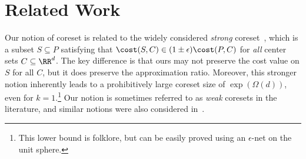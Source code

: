 \section{Related Work}
\label{sec:related}



Our notion of coreset is related to the widely considered \emph{strong} coreset~\cite{AgarwalHV04,Har-PeledM04},
which is a subset $S \subseteq P$ satisfying that $\cost(S, C) \in (1 \pm \epsilon) \cost(P, C)$ for \emph{all} center sets $C \subseteq \RR^d$.
The key difference is that ours may not preserve the cost value on $S$ for all $C$,
but it does preserve the approximation ratio.
Moreover, this stronger notion inherently leads to a prohibitively large coreset size of $\exp(\Omega(d))$, even for $k = 1$.\footnote{This lower bound is folklore, but can be easily proved using an $\epsilon$-net on the unit sphere.
}
Our notion is sometimes referred to as \emph{weak} coresets in the literature, and similar notions were also considered in~\cite{FeldmanMS07,MunteanuS18,HuangJL23,CGJK25}.